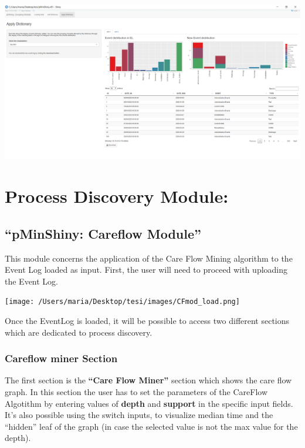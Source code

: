 \documentclass[
]{book}
\begin{document}
\includegraphics[width=1\textwidth,height=\textheight]{images/gmod3.png}

\hypertarget{process-discovery-module}{%
\chapter{Process Discovery Module:}\label{process-discovery-module}}

\hypertarget{pminshiny-careflow-module}{%
\section{``pMinShiny: Careflow Module''}\label{pminshiny-careflow-module}}

This module concerns the application of the Care Flow Mining algorithm to the Event Log loaded as input.
First, the user will need to proceed with uploading the Event Log.

\texttt{[image: /Users/maria/Desktop/tesi/images/CFmod\_load.png]}

Once the EventLog is loaded, it will be possible to access two different sections which are dedicated to process discovery.

\hypertarget{careflow-miner-section}{%
\subsection{Careflow miner Section}\label{careflow-miner-section}}

The first section is the \textbf{``Care Flow Miner''} section which shows the care flow graph. In this section the user has to set the parameters of the CareFlow Algotithm by entering values of \textbf{depth} and \textbf{support} in the specific input fields.
It's also possible using the switch inputs, to visualize median time and the ``hidden'' leaf of the graph (in case the selected value is not the max value for the depth).
\end{document}
